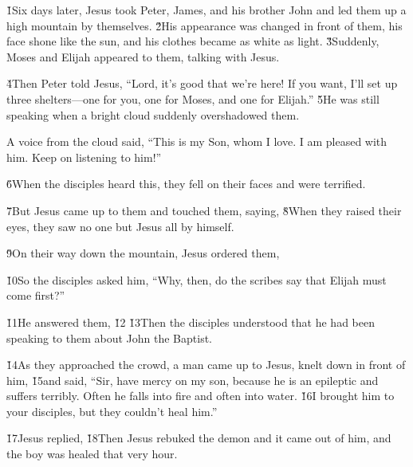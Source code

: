 \v{1}Six days later, Jesus took Peter, James, and his brother John and led them up a high mountain by themselves. \v{2}His appearance was changed in front of them, his face shone like the sun, and his clothes became as white as light. \v{3}Suddenly, Moses and Elijah appeared to them, talking with Jesus.

\v{4}Then Peter told Jesus, ``Lord, it's good that we're here! If you want, I'll set up three shelters---one for you, one for Moses, and one for Elijah.'' \v{5}He was still speaking when a bright cloud suddenly overshadowed them.

A voice from the cloud said, ``This is my Son, whom I love. I am pleased with him. Keep on listening to him!''

\v{6}When the disciples heard this, they fell on their faces and were terrified.

\v{7}But Jesus came up to them and touched them, saying,  \v{8}When they raised their eyes, they saw no one but Jesus all by himself.

\v{9}On their way down the mountain, Jesus ordered them, 

\v{10}So the disciples asked him, ``Why, then, do the scribes say that Elijah must come first?''

\v{11}He answered them,  \v{12} \v{13}Then the disciples understood that he had been speaking to them about John the Baptist.

\v{14}As they approached the crowd, a man came up to Jesus, knelt down in front of him, \v{15}and said, ``Sir, have mercy on my son, because he is an epileptic and suffers terribly. Often he falls into fire and often into water. \v{16}I brought him to your disciples, but they couldn't heal him.''

\v{17}Jesus replied,  \v{18}Then Jesus rebuked the demon and it came out of him, and the boy was healed that very hour.

